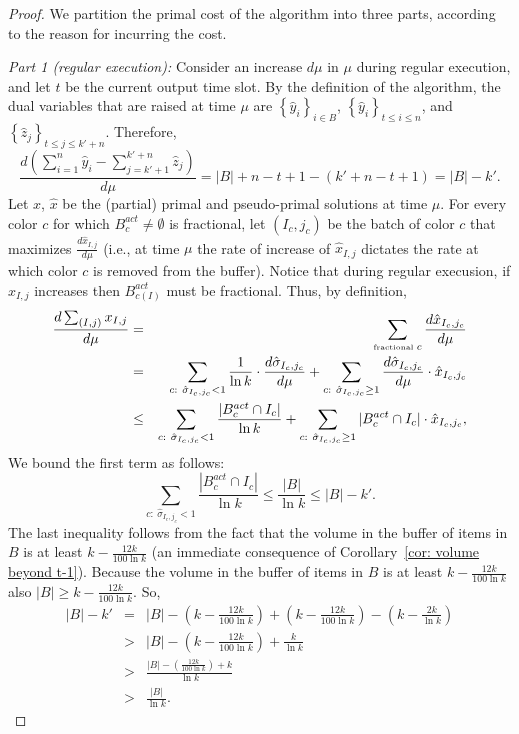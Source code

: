 \documentclass[12pt]{article}
\begin{document}
\begin{proof}
We partition the primal cost of the algorithm into three parts,
according to the reason for incurring the cost.

{\em Part 1 (regular execution):}\/
Consider an increase $d\mu$ in $\mu$ during regular
execution, and let $t$ be the current output time slot.
By the definition of the algorithm, the dual variables that 
are raised at time $\mu$ 
are $\left\{\hat{y}_i\right\}_{i\in B}$, $\left\{\hat{y}_i\right\}_{ t\le i\le n}$, and
$\left\{\hat{z}_j\right\}_{t\le j \le k'+n}$. Therefore,
$$
\frac{d\left(\sum_{i=1}^{n} \hat{y}_i 
- \sum_{j=k'+1}^{k'+n} \hat{z}_j\right)}{d\mu} =
|B|+n-t+1 -(k'+n-t+1)=|B|-k'.
$$
Let $x$, $\hat{x}$ be the (partial) primal and pseudo-primal 
solutions at time $\mu$.
For every color $c$ for which $B_c^{act}\ne\emptyset$ is
fractional, let $(I_c,j_c)$ be the batch of color $c$
that maximizes $\frac{d\hat{x}_{I,j}}{d\mu}$ (i.e., at time
$\mu$ the rate of increase of $\hat{x}_{I,j}$ dictates the
rate at which color $c$ is removed from the buffer).
Notice that during regular execusion, if $x_{I,j}$ increases
then $B_{c(I)}^{act}$ must be fractional. 
Thus, by definition,
\begin{eqnarray*}
\frac{d\sum_{(I,j)} x_{I,j}}{d\mu}
&=&\sum_{\hbox{\tiny fractional } c} \frac{d\hat{x}_{I_c,j_c}}{d\mu}\\
&=&\sum_{c:\ \hat{\sigma}_{I_c,j_c}<1} 
\frac{1}{\ln k }\cdot\frac{d\hat{\sigma}_{I_c,j_c}}{d\mu}
+\sum_{c:\ \hat{\sigma}_{I_c,j_c}\ge 1} 
\frac{d\hat{\sigma}_{I_c,j_c}}{d\mu}\cdot \hat{x}_{I_c,j_c}\\
&\le&\sum_{c:\ \hat{\sigma}_{I_c,j_c}<1} \frac{|B_c^{act}\cap I_c|}{\ln k}
+\sum_{c:\ \hat{\sigma}_{I_c,j_c}\ge 1}|B_c^{act}\cap I_c|\cdot \hat{x}_{I_c,j_c},
\end{eqnarray*}
We bound the first term as follows:
$$
\sum_{c:\ \hat{\sigma}_{I_c,j_c}<1} \frac{|B_c^{act}\cap I_c|}{\ln k}\le 
\frac{|B|}{\ln k}\le |B|-k'.
$$
The last inequality follows from the fact that the volume in the buffer
of items in $B$ is at least $k-\frac{12k}{100\ln k}$ (an immediate
consequence of Corollary~\ref{cor: volume beyond t-1}).
Because the volume in the buffer of items in $B$ 
is at least $k-\frac{12k}{100\ln k}$
also $|B|\ge k-\frac{12k}{100\ln k}$. So,
\begin{eqnarray*}
|B|-k'&=& |B|-(k-\frac{12k}{100\ln k})+(k-\frac{12k}{100\ln k})-(k-\frac{2k}{\ln k})\\
&>&|B|-(k-\frac{12k}{100\ln k}) +\frac{k}{\ln k}\\
&>& \frac{|B|-(\frac{12k}{100\ln k}) +k}{\ln k}\\
&>& \frac{|B|}{\ln k}.
\end{eqnarray*}


\end{proof}
\end{document}
